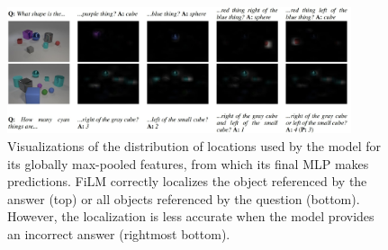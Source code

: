 \begin{figure}[t]
    \centering
    \includegraphics[width=0.9\textwidth]{figures/images/film/film_attention.jpg}
    \caption{Visualizations of the distribution of locations used by the model for its globally max-pooled features, from which its final MLP makes predictions. FiLM correctly localizes the object referenced by the answer (top) or all objects referenced by the question (bottom). However, the localization is less accurate when the model provides an incorrect answer (rightmost bottom).}
    \label{fig:film_attention}
\end{figure}
